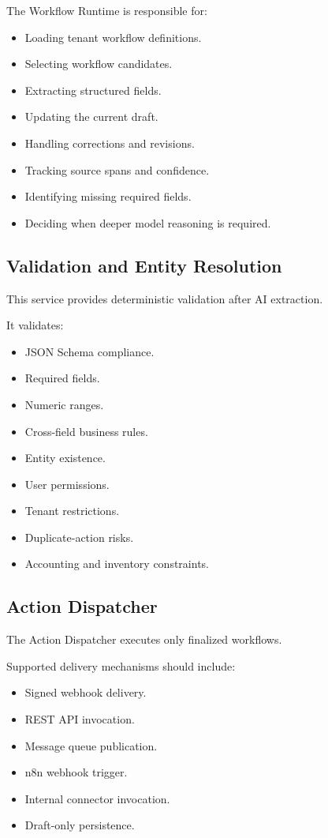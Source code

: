 \documentclass[11pt,a4paper]{article}
\begin{document}
The Workflow Runtime is responsible for:

\begin{itemize}
\item Loading tenant workflow definitions.
\item Selecting workflow candidates.
\item Extracting structured fields.
\item Updating the current draft.
\item Handling corrections and revisions.
\item Tracking source spans and confidence.
\item Identifying missing required fields.
\item Deciding when deeper model reasoning is required.
\end{itemize}

\subsection{Validation and Entity Resolution}

This service provides deterministic validation after AI extraction.

It validates:

\begin{itemize}
\item JSON Schema compliance.
\item Required fields.
\item Numeric ranges.
\item Cross-field business rules.
\item Entity existence.
\item User permissions.
\item Tenant restrictions.
\item Duplicate-action risks.
\item Accounting and inventory constraints.
\end{itemize}

\subsection{Action Dispatcher}

The Action Dispatcher executes only finalized workflows.

Supported delivery mechanisms should include:

\begin{itemize}
\item Signed webhook delivery.
\item REST API invocation.
\item Message queue publication.
\item n8n webhook trigger.
\item Internal connector invocation.
\item Draft-only persistence.
\end{itemize}
\end{document}
